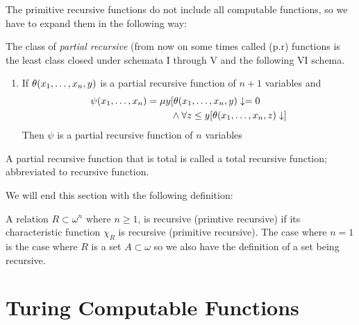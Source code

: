 \documentclass[../main.tex]{subfiles}
\begin{document}
The primitive recursive functions do not include all computable
functions, so we have to expand them in the following way:
\begin{defi}
		The class of \textit{partial recursive} (from now on some times
		called (p.r) functions is the least class closed under schemata
		I through V and the following VI schema. 
		\begin{enumerate}[label=\Roman*., start=6]
			\item If $\theta(x_1,\ldots,x_n,y)$ is a partial recursive function
				of $n+1$ variables and 
				\begin{align*}
					\psi(x_1,\ldots,x_n)=\mu
					y&[\theta(x_1,\ldots,x_n,y)\downarrow=0\\
						&\wedge \forall z\leq y
					[\theta(x_1,\ldots,x_n,z)\downarrow]
				\end{align*}
				Then $\psi$ is a partial recursive function of
				$n$ variables
		\end{enumerate}
		A partial recursive function that is total is called a total
		recursive function; abbreviated to recursive function.
\end{defi}

We will end this section with the following definition:
\begin{defi}
	A relation $R\subset\omega^n$ where $n\geq 1$, is recursive (primtive
	recursive) if its characteristic function $\chi_R$ is recursive
	(primitive recursive). The case where $n=1$ is the case where $R$ is a
	set $A\subset\omega$ so we also have the definition of a set being
	recursive.
\end{defi}

\section{Turing Computable Functions}
\end{document}
